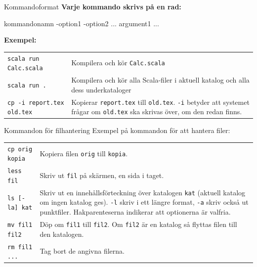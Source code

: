 \begin{Slide}{Kommandoformat}\SlideFontSmall
    \textbf{Varje kommando skrivs på en rad:}

\begin{Code}[language=]
kommandonamn -option1 -option2 ... argument1 ...
\end{Code}

    \begin{itemize}
    \end{itemize}

    \halfblankline
    \noindent\textbf{Exempel:}

    \halfblankline
        \begin{tabular}{lp{60mm}}
        \texttt{scala run Calc.scala}        & Kompilera och kör \texttt{Calc.scala}\\
        \texttt{scala run .}        & Kompilera och kör alla Scala-filer i aktuell katalog och alla dess underkataloger\\
        \texttt{cp -i report.tex old.tex} & Kopierar \texttt{report.tex} till \texttt{old.tex}. \texttt{-i} betyder att systemet frågar om \texttt{old.tex} ska skrivas över, om den redan finns. \\
        \end{tabular}
\end{Slide}



\begin{Slide}{Kommandon för filhantering}\SlideFontSmall
    Exempel på kommandon för att hantera filer:

    \blankline
    \begin{tabular}{lp{7.0cm}}
        \texttt{cp orig kopia} & Kopiera filen \texttt{orig} till \texttt{kopia}.                                                                                                                                 \\
        \texttt{less fil}      & Skriv ut \texttt{fil} på skärmen, en sida i taget.                                                                                                                             \\
        \texttt{ls [-la] kat}  & Skriv ut en innehållsförteckning över katalogen \texttt{kat} (aktuell katalog om ingen katalog ges). \texttt{-l} skriv i ett längre format, \texttt{-a} skriv också ut punktfiler. Hakparenteserna indikerar att optionerna är valfria. \\
        \texttt{mv fil1 fil2}  & Döp om \texttt{fil1} till \texttt{fil2}. Om \texttt{fil2} är en katalog så flyttas filen till den katalogen.                                                                       \\
        \texttt{rm fil1 ...}   & Tag bort de angivna filerna.                                                                                                                                                 \\
    \end{tabular}
\end{Slide}

